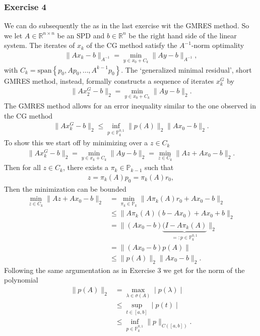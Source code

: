 \subsubsection{Exercise 4}
We can do subsequently the as in the last exercise wit the GMRES method. So
we let $A \in \mathbb{R}^{n \times n}$ be an SPD and $b \in \mathbb{R}^{n}$
be the right hand side of the linear system. The iterates of $x_k$  of the CG
method satisfy the $A^{-1}$-norm optimality
\begin{align}
    \|Ax_k - b\|_{A^{-1}} = \min_{y\in x_0 + C_k} \|Ay - b\|_{A^{-1}},
\end{align}
with $C_k = \text{span}\left\{ p_0, Ap_0, \ldots , A^{k-1}p_0 \right\}$. The
`generalized minimal residual', short GMRES method, instead, formally
constructs a sequence of iterates $x_k^G$ by
\begin{align}
    \|Ax^G_2 - b \|_2 = \min_{y \in x_0 + C_k}\|Ay - b\|_2.
\end{align}
The GMRES method allows for an error inequality similar to the one observed
in the CG method
\begin{align}
    \|Ax_k^G - b\|_2 \le \inf_{p \in \mathbb{P}_k^{0,1}} \|p(A)\|_2 \|Ax_0
    -b\|_2.
\end{align}
To show this we start off by minimizing over a $z \in C_k$
\begin{align}
    \|Ax_k^G - b\|_2 = \min_{y\in x_k + C_k} \|Ay - b\|_2 = \min_{z \in
    C_k}\|Az + Ax_0 -b\|_2.
\end{align}
Then for all $z \in C_k$, there exists a $\pi_k \in \mathbb{P}_{k-1}$ such that
\begin{align}
    z = \pi_k(A) p_0 = \pi_k(A) r_0,
\end{align}
Then the minimization can be bounded
\begin{align}
    \min_{z \in C_k} \|Az + Ax_0 - b\|_2 &=
    \min_{\pi_k \in \mathbb{P}_k}\|A\pi_k(A)r_0 + Ax_0 -b\|_2\\
        &\le \|A\pi_k(A) (b-Ax_0) + Ax_0 +b\|_2\\
        &= \|(Ax_0 -b)\underbrace{(I-A\pi_k(A)}_{=:p \in
        \mathbb{P}_k^{0,1}}\|_2\\
        &= \|(Ax_0-b)p(A)\|\\
        &\le \|p(A)\|_2 \|Ax_0 -b\|_2.
\end{align}
Following the same argumentation as in Exercise 3 we get for the norm of the
polynomial
\begin{align}
    \|p(A)\|_2  &= \max_{\lambda \in \sigma(A)}  \mid p(\lambda) \mid\\
    &\le \sup_{t\in [a,b]}  \mid p(t) \mid\\
    &\le \inf_{p \in \mathbb{P}_k^{0,1}} \|p\|_{C\left([a,b]  \right) }.
\end{align}






